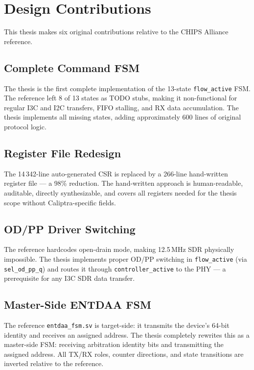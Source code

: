\documentclass[12pt, a4paper, oneside]{report}
\newcommand{\signal}[1]{\texttt{#1}}
\newcommand{\file}[1]{\texttt{#1}}
\newcommand{\module}[1]{\texttt{#1}}
\begin{document}
\section{Design Contributions}

This thesis makes six original contributions relative to the CHIPS Alliance reference.

\subsection{Complete Command FSM}

The thesis is the first complete implementation of the 13-state \module{flow\_active}
FSM. The reference left 8 of 13 states as TODO stubs, making it non-functional for
regular I3C and I2C transfers, FIFO stalling, and RX data accumulation. The thesis
implements all missing states, adding approximately 600 lines of original protocol logic.

\subsection{Register File Redesign}

The 14\,342-line auto-generated CSR is replaced by a 266-line hand-written register
file --- a 98\% reduction. The hand-written approach is human-readable, auditable,
directly synthesizable, and covers all registers needed for the thesis scope without
Caliptra-specific fields.

\subsection{OD/PP Driver Switching}

The reference hardcodes open-drain mode, making 12.5\,MHz SDR physically impossible.
The thesis implements proper OD/PP switching in \module{flow\_active} (via
\signal{sel\_od\_pp\_q}) and routes it through \module{controller\_active} to the PHY
--- a prerequisite for any I3C SDR data transfer.

\subsection{Master-Side ENTDAA FSM}

The reference \file{entdaa\_fsm.sv} is target-side: it transmits the device's 64-bit
identity and receives an assigned address. The thesis completely rewrites this as a
master-side FSM: receiving arbitration identity bits and transmitting the assigned
address. All TX/RX roles, counter directions, and state transitions are inverted
relative to the reference.
\end{document}
